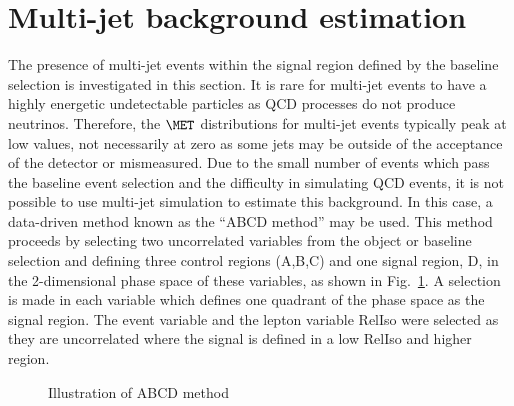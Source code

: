 \section{Multi-jet background estimation}
\label{sec:QCDbackground}
The presence of multi-jet events within the signal region defined by the baseline selection is investigated in this section. It is rare for multi-jet events to have a highly energetic undetectable particles as QCD processes do not produce neutrinos. Therefore, the $\MET$ distributions for multi-jet events typically peak at low values, not necessarily at zero as some jets may be outside of the acceptance of the detector or mismeasured. Due to the small number of events which pass the baseline event selection and the difficulty in simulating QCD events, it is not possible to use multi-jet simulation to estimate this background. In this case, a data-driven method known as the ``ABCD method'' may be used. This method proceeds by selecting two uncorrelated variables from the object or baseline selection and defining three control regions (A,B,C) and one signal region, D, in the 2-dimensional phase space of these variables, as shown in Fig.~\ref{fig:ABCDdiagram}. A selection is made in each variable which defines one quadrant of the phase space as the signal region.  The event variable \MET and the lepton variable RelIso were selected as they are uncorrelated where the signal is defined in a low RelIso and higher \MET region.\\

\begin{figure}[ht!]
\begin{center}
\hspace{0.2cm}
\end{center}
\caption{Illustration of ABCD method}
\label{fig:ABCDdiagram}
\end{figure}

